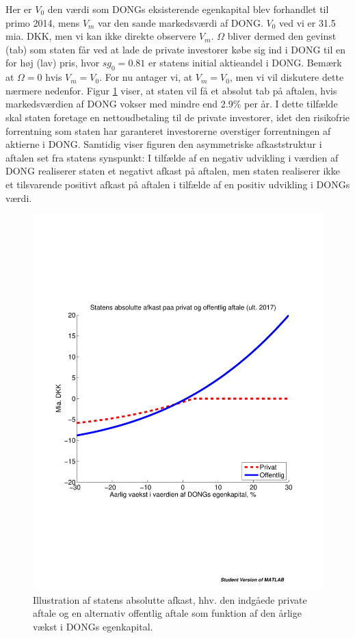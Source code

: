 \documentclass{article}
\begin{document}
Her er $V_0$ den værdi som DONGs eksisterende egenkapital blev forhandlet til primo 2014, mens $V_m$ var den sande markedsværdi af DONG. $V_0$ ved vi er 31.5 mia. DKK, men vi kan ikke direkte observere $V_m$. $\Omega$ bliver dermed den gevinst (tab) som staten får ved at lade de private investorer købe sig ind i DONG til en for høj (lav) pris, hvor $sg_0=0.81$ er statens initial aktieandel i DONG. Bemærk at $\Omega=0$ hvis $V_m=V_0$. For nu antager vi, at $V_m=V_0$, men vi vil diskutere dette nærmere nedenfor. Figur \ref{fig:privat_off} viser, at staten vil få et absolut tab på aftalen, hvis markedsværdien af DONG vokser med mindre end 2.9\% per år. I dette tilfælde skal staten foretage en nettoudbetaling til de private investorer, idet den risikofrie forrentning som staten har garanteret investorerne overstiger forrentningen af aktierne i DONG. Samtidig viser figuren den asymmetriske afkaststruktur i aftalen set fra statens synspunkt: I tilfælde af en negativ udvikling i værdien af DONG realiserer staten et negativt afkast på aftalen, men staten realiserer ikke et tilsvarende positivt afkast på aftalen i tilfælde af en positiv udvikling i DONGs værdi. 

\begin{figure}
\includegraphics[scale=0.8]{../matlab/figs/private_public_deal}
\caption{Illustration af statens absolutte afkast, hhv. den indg\aa{}ede private aftale og en alternativ offentlig aftale som funktion af den \aa{}rlige v\ae{}kst i DONGs egenkapital. }
\label{fig:privat_off}
\end{figure}
\end{document}
